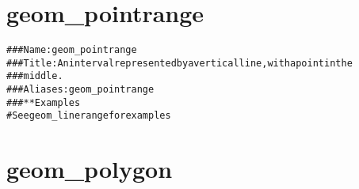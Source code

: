 \documentclass[a4paper,titlepage]{tufte-handout}\usepackage{graphicx, color}
\makeatletter
\newcommand{\hlcomment}[1]{\textcolor[rgb]{0.180392156862745,0.6,0.341176470588235}{#1}}%
\newenvironment{kframe}{%
 \def\at@end@of@kframe{}%
 \ifinner\ifhmode%
  \def\at@end@of@kframe{\end{minipage}}%
  \begin{minipage}{\columnwidth}%
 \fi\fi%
 \def\FrameCommand##1{\hskip\@totalleftmargin \hskip-\fboxsep
 \colorbox{shadecolor}{##1}\hskip-\fboxsep
     \hskip-\linewidth \hskip-\@totalleftmargin \hskip\columnwidth}%
 \MakeFramed {\advance\hsize-\width
   \@totalleftmargin\z@ \linewidth\hsize
   \@setminipage}}%
 {\par\unskip\endMakeFramed%
 \at@end@of@kframe}
\newenvironment{knitrout}{}{} %
\makeatother
\begin{document}
\section{geom\_pointrange}

\begin{knitrout}
\color{fgcolor}\begin{kframe}
\begin{alltt}
\hlcomment{### Name: geom_pointrange}
\hlcomment{### Title: An interval represented by a vertical line, with a point in the}
\hlcomment{###   middle.}
\hlcomment{### Aliases: geom_pointrange}
\hlcomment{### ** Examples}
\hlcomment{# See geom_linerange for examples}
\end{alltt}
\end{kframe}
\end{knitrout}


\section{geom\_polygon}
\end{document}
